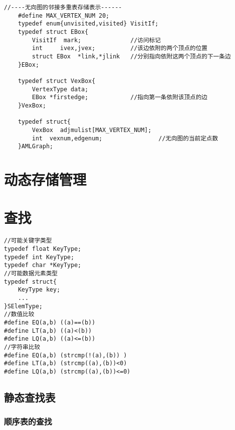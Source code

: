 \documentclass[UTF8]{ctexart}
\begin{document}
\begin{lstlisting}[style=v1]
    //----无向图的邻接多重表存储表示------
    #define MAX_VERTEX_NUM 20;
    typedef enum{unvisited,visited} VisitIf;        
    typedef struct EBox{
        VisitIf  mark;              //访问标记
        int     ivex,jvex;          //该边依附的两个顶点的位置
        struct EBox  *link,*jlink   //分别指向依附这两个顶点的下一条边
    }EBox;

    typedef struct VexBox{
        VertexType data;
        EBox *firstedge;            //指向第一条依附该顶点的边
    }VexBox;

    typedef struct{
        VexBox  adjmulist[MAX_VERTEX_NUM];
        int  vexnum,edgenum;                //无向图的当前定点数       
    }AMLGraph;

\end{lstlisting}




















\newpage
\section{动态存储管理}



\newpage
\section{查找}
\begin{lstlisting}[style=v1]
//可能关键字类型
typedef float KeyType;
typedef int KeyType;
typedef char *KeyType;
//可能数据元素类型
typedef struct{
    KeyType key;
    ...
}SElemType;
//数值比较
#define EQ(a,b) ((a)==(b))
#define LT(a,b) ((a)<(b))
#define LQ(a,b) ((a)<=(b))
//字符串比较
#define EQ(a,b) (strcmp(!(a),(b)) )
#define LT(a,b) (strcmp((a),(b))<0)
#define LQ(a,b) (strcmp((a),(b))<=0)

\end{lstlisting}




\subsection{静态查找表}
\subsubsection{顺序表的查找}
\end{document}
